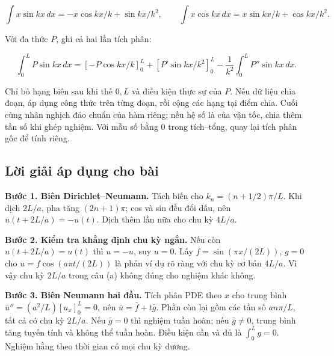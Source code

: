 \documentclass[10pt,a4paper]{article}
\begin{document}
\[
\int x\sin kx\,dx=-x\cos kx/k+\sin kx/k^2,\qquad
\int x\cos kx\,dx=x\sin kx/k+\cos kx/k^2.
\]


Với đa thức $P$, ghi cả hai lần tích phân:


\[
\int_0^L P\sin kx\,dx
=\left[-P\cos kx/k\right]_0^L+
\left[P'\sin kx/k^2\right]_0^L-
\frac1{k^2}\int_0^L P''\sin kx\,dx.
\]


Chỉ bỏ hạng biên sau khi thế $0,L$ và điều kiện thực sự của $P$. Nếu dữ liệu chia đoạn, áp dụng công thức trên từng đoạn, rồi cộng các hạng tại điểm chia. Cuối cùng nhân nghịch đảo chuẩn của hàm riêng; nếu hệ số là của vận tốc, chia thêm tần số khi ghép nghiệm. Với mẫu số bằng $0$ trong tích–tổng, quay lại tích phân gốc để tính riêng.
\subsection*{Lời giải áp dụng cho bài}
\textbf{Bước 1. Biên Dirichlet–Neumann.} Tách biến cho $k_n=(n+1/2)\pi/L$. Khi dịch $2L/a$, pha tăng $(2n+1)\pi$; cos và sin đều đổi dấu, nên $u(t+2L/a)=-u(t)$. Dịch thêm lần nữa cho chu kỳ $4L/a$.

\textbf{Bước 2. Kiểm tra khẳng định chu kỳ ngắn.} Nếu còn $u(t+2L/a)=u(t)$ thì $u=-u$, suy $u=0$. Lấy $f=\sin(\pi x/(2L))$, $g=0$ cho $u=f\cos(a\pi t/(2L))$ là phản ví dụ rõ ràng với chu kỳ cơ bản $4L/a$. Vì vậy chu kỳ $2L/a$ trong câu (a) không đúng cho nghiệm khác không.

\textbf{Bước 3. Biên Neumann hai đầu.} Tích phân PDE theo $x$ cho trung bình $\bar u''=(a^2/L)[u_x]_0^L=0$, nên $\bar u=\bar f+t\bar g$. Phần còn lại gồm các tần số $an\pi/L$, tất cả có chu kỳ $2L/a$. Nếu $\bar g=0$ thì nghiệm tuần hoàn; nếu $\bar g\ne0$, trung bình tăng tuyến tính và không thể tuần hoàn. Điều kiện cần và đủ là $\int_0^Lg=0$. Nghiệm hằng theo thời gian có mọi chu kỳ dương.
\end{document}
